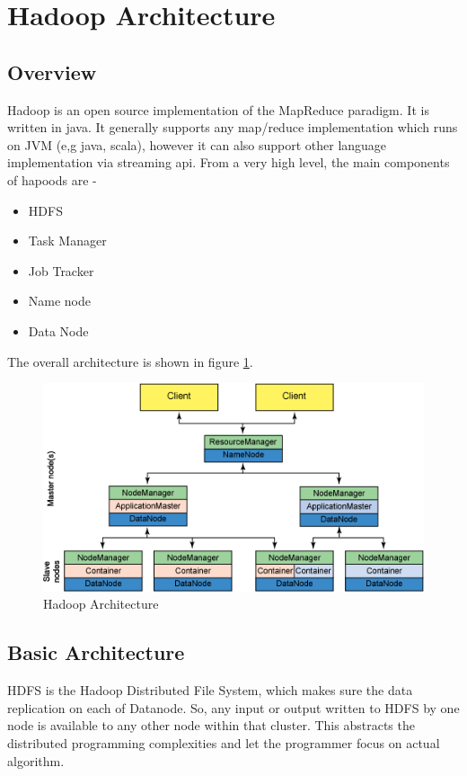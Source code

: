 \documentclass{article}
\begin{document}
\section{Hadoop Architecture}
\subsection {Overview}
Hadoop is an open source implementation of the MapReduce paradigm. It is written in java. It generally supports any map/reduce implementation which runs on JVM (e,g java, scala), however it can also support other language implementation via streaming api. From a very high level, the main components of hapoods are -
\begin{itemize}
\item HDFS
\item Task Manager
\item Job Tracker
\item Name node
\item Data Node
\end{itemize}

The overall architecture is shown in figure \ref{fig:hadoop-arch}\cite{hadoopibm}.

\begin{figure}[h]
	\centering
	\includegraphics[width=\textwidth]{hadoop-arch}
	\caption{Hadoop Architecture}
	\label{fig:hadoop-arch}
\end{figure}

\subsection {Basic Architecture}

HDFS is the Hadoop Distributed File System, which makes sure the data replication on each of Datanode. So, any input or output written to HDFS by one node is available to any other node within that cluster. This abstracts the distributed programming complexities and let the programmer focus on actual algorithm.
\end{document}
